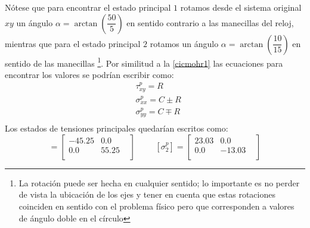 \documentclass[../notas medios.tex]{subfiles}
\begin{document}
\begin{enumerate}
%
%
%
Nótese que para encontrar el estado principal $1$ rotamos desde el sistema
original $xy$ un ángulo $\alpha = \arctan\left(\dfrac{50}{5}\right)$ en sentido
contrario a las manecillas del reloj, mientras que para el estado principal $2$
rotamos un ángulo $\alpha = \arctan\left(\dfrac{10}{15}\right)$ en sentido de
las manecillas \footnote{La rotación puede ser hecha en cualquier sentido; lo
importante es no perder de vista la ubicación de los ejes y tener en cuenta
que estas rotaciones coinciden en sentido con el problema físico pero que
corresponden a valores de ángulo doble en el círculo}.
Por similitud a la  \cref{cicmohr1} las ecuaciones para encontrar los valores se podrían escribir como:\\
%
\begin {equation}
\begin {aligned}
&\tau^p_{xy} = R \\
&\sigma^p_{xx} = C \pm R \\
&\sigma^p_{yy} = C \mp R  \\
\end {aligned}
\label{cicmohr2}
\end {equation}
%
Los estados de tensiones principales quedarían escritos como:\\
%
 \begin{equation}
[\sigma^p_{1}] =
 	\begin{bmatrix}
     	-45.25 & 0.0 &  \\
     	0.0 & 55.25 \\
 	\end{bmatrix}
 \hspace{1cm}
 [\sigma^p_{2}] =
 	\begin{bmatrix}
     	23.03 & 0.0 &  \\
     	0.0 & -13.03 \\
 	\end{bmatrix}
\end{equation}
%


\end{enumerate}
\end{document}
